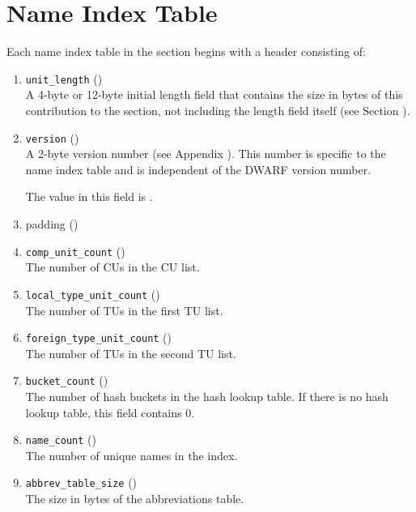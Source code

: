 \section{Name Index Table}
\label{datarep:nameindextable}
Each name index table in the \dotdebugnames{} section 
begins with a header consisting of:
\begin{enumerate}[1. ]
\item \texttt{unit\_length} () \\
A 4-byte or 12-byte initial length field that 
contains the size in bytes of this contribution to the \dotdebugnames{} 
section, not including the length field itself
(see Section ).

\item \texttt{version} (\HFTuhalf) \\
A 2-byte version number 
(see Appendix ). 
This number is specific to the name index table and is
independent of the DWARF version number.

The value in this field is \versiondotdebugnames.

\item padding (\HFTuhalf) \\

\item \texttt{comp\_unit\_count} (\HFTuword) \\
The number of CUs in the CU list.

\item \texttt{local\_type\_unit\_count} (\HFTuword) \\
The number of TUs in the first TU list.

\item \texttt{foreign\_type\_unit\_count} (\HFTuword) \\
The number of TUs in the second TU list.

\item \texttt{bucket\_count} (\HFTuword) \\
The number of hash buckets in the hash lookup table. 
If there is no hash lookup table, this field contains 0.

\item \texttt{name\_count} (\HFTuword) \\
The number of unique names in the index.

\item \texttt{abbrev\_table\_size} (\HFTuword) \\
The size in bytes of the abbreviations table.


\end{enumerate}
